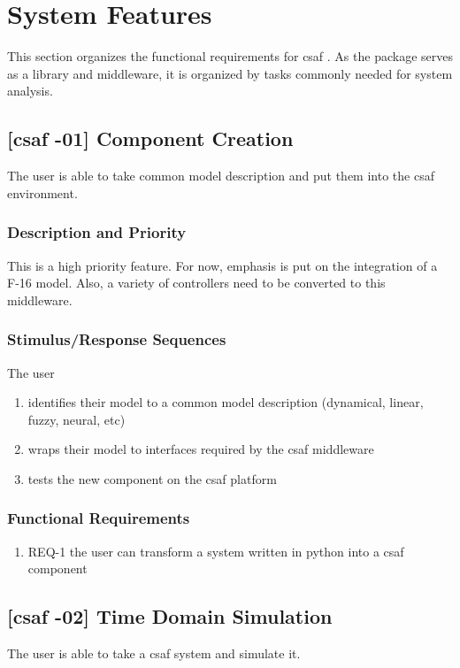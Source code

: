 \chapter{System Features}
This section organizes the functional requirements for \acrshort{csaf} . As the package serves as a library and 
middleware, it is organized by tasks commonly needed for system analysis.

\section{[\acrshort{csaf} -01] Component Creation}
The user is able to take common model description and put them into the \acrshort{csaf} environment.

\subsection{Description and Priority}
This is a high priority feature. For now, emphasis is put on the integration of a F-16 model. Also, a variety of controllers need to be converted to this middleware.

\subsection{Stimulus/Response Sequences}
The user
\begin{enumerate}
\item identifies their model to a common model description (dynamical, linear, fuzzy, neural, etc)
\item wraps their model to interfaces required by the \acrshort{csaf}  middleware
\item tests the new component on the \acrshort{csaf}  platform
\end{enumerate}

\subsection{Functional Requirements}
\begin{enumerate}
\item REQ-1 \quad the user can transform a system written in python into a \acrshort{csaf}  component
\end{enumerate}

\section{[\acrshort{csaf} -02] Time Domain Simulation}
The user is able to take a \acrshort{csaf}  system and simulate it.


